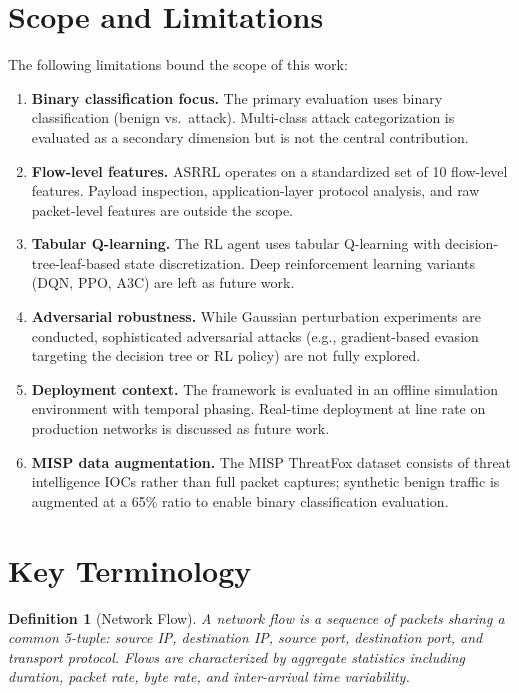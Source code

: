 \documentclass[12pt, letterpaper, oneside]{report}
\newtheorem{definition}{Definition}[chapter]
\newcommand{\ASRRL}{\textsc{ASRRL}}
\begin{document}
\section{Scope and Limitations}
\label{sec:limitations}

The following limitations bound the scope of this work:

\begin{enumerate}
    \item \textbf{Binary classification focus.} The primary evaluation uses binary classification (benign vs.\ attack). Multi-class attack categorization is evaluated as a secondary dimension but is not the central contribution.

    \item \textbf{Flow-level features.} \ASRRL{} operates on a standardized set of 10 flow-level features. Payload inspection, application-layer protocol analysis, and raw packet-level features are outside the scope.

    \item \textbf{Tabular Q-learning.} The RL agent uses tabular Q-learning with decision-tree-leaf-based state discretization. Deep reinforcement learning variants (DQN, PPO, A3C) are left as future work.

    \item \textbf{Adversarial robustness.} While Gaussian perturbation experiments are conducted, sophisticated adversarial attacks (e.g., gradient-based evasion targeting the decision tree or RL policy) are not fully explored.

    \item \textbf{Deployment context.} The framework is evaluated in an offline simulation environment with temporal phasing. Real-time deployment at line rate on production networks is discussed as future work.

    \item \textbf{MISP data augmentation.} The MISP ThreatFox dataset consists of threat intelligence IOCs rather than full packet captures; synthetic benign traffic is augmented at a 65\% ratio to enable binary classification evaluation.
\end{enumerate}


\section{Key Terminology}
\label{sec:terminology}

\begin{definition}[Network Flow]
A network flow is a sequence of packets sharing a common 5-tuple: source IP, destination IP, source port, destination port, and transport protocol. Flows are characterized by aggregate statistics including duration, packet rate, byte rate, and inter-arrival time variability.
\end{definition}
\end{document}
